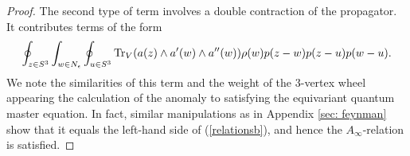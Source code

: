 \begin{proof}
The second type of term involves a double contraction of the propagator. 
It contributes terms of the form
\[
\oint_{z \in S^3} \int_{w \in N_\epsilon} \oint_{u \in S^3} {\rm Tr}_V(a(z) \wedge a'(w) \wedge a''(w)) \rho(w) p(z-w) p(z-u) p(w-u) .
\]
We note the similarities of this term and the weight of the $3$-vertex wheel appearing the calculation of the anomaly to satisfying the equivariant quantum master equation. 
In fact, similar manipulations as in Appendix \ref{sec: feynman} show that it equals the left-hand side of (\ref{relationsb}), and hence the $A_\infty$-relation is satisfied.
%
\end{proof}


